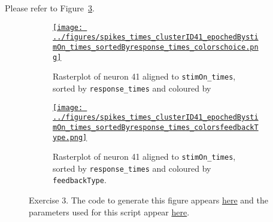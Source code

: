 \documentclass{article}
\begin{document}
Please refer to Figure~\ref{fig:ex3}.

\begin{figure}
    \begin{center}

        \begin{subfigure}{1.0\textwidth}
            \centering
            \href{https://www.gatsby.ucl.ac.uk/~rapela/neuroinformatics/2023/ws1/figures/spikes_times_clusterID41_epochedBystimOn_times_sortedByresponse_times_colorschoice.html}{\texttt{[image: ../figures/spikes\_times\_clusterID41\_epochedBystimOn\_times\_sortedByresponse\_times\_colorschoice.png]}}

            \caption{Rasterplot of neuron 41 aligned to
            \texttt{stimOn\_times},
            sorted by
            \texttt{response\_times}
            and coloured by
            }

            \label{fig:ex3_1}
        \end{subfigure}

        \begin{subfigure}{1.0\textwidth}
            \centering
            \href{https://www.gatsby.ucl.ac.uk/~rapela/neuroinformatics/2023/ws1/figures/spikes_times_clusterID41_epochedBystimOn_times_sortedByresponse_times_colorsfeedbackType.html}{\texttt{[image: ../figures/spikes\_times\_clusterID41\_epochedBystimOn\_times\_sortedByresponse\_times\_colorsfeedbackType.png]}}

            \caption{Rasterplot of neuron 41 aligned to
            \texttt{stimOn\_times},
            sorted by
            \texttt{response\_times}
            and coloured by
            \texttt{feedbackType}.
            }

            \label{fig:ex3_2}
        \end{subfigure}

        \caption{Exercise 3. The code to generate this figure appears
        \href{https://github.com/joacorapela/neuroinformatics23/blob/master/worksheets/ws1/mySolution/code/scripts/doPlotEpochedSpikesTimes.py}{here}
        and the parameters used for this script appear
        \href{https://github.com/joacorapela/neuroinformatics23/blob/master/worksheets/ws1/mySolution/code/scripts/doPlotEpochedSpikesTimes.csh}{here}.
        }

        \label{fig:ex3}


    \end{center}
\end{figure}
\end{document}
